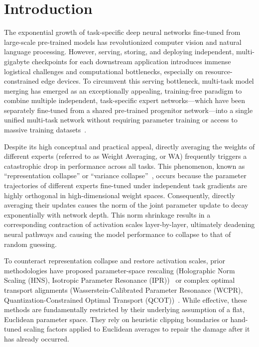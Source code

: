 \documentclass{article}
\theoremstyle{plain}
\theoremstyle{definition}
\theoremstyle{remark}
\begin{document}
\section{Introduction}
\label{sec:intro}
The exponential growth of task-specific deep neural networks fine-tuned from large-scale pre-trained models has revolutionized computer vision and natural language processing. However, serving, storing, and deploying independent, multi-gigabyte checkpoints for each downstream application introduces immense logistical challenges and computational bottlenecks, especially on resource-constrained edge devices. To circumvent this serving bottleneck, multi-task model merging has emerged as an exceptionally appealing, training-free paradigm to combine multiple independent, task-specific expert networks---which have been separately fine-tuned from a shared pre-trained progenitor network---into a single unified multi-task network without requiring parameter training or access to massive training datasets~\cite{wortsman2022model, ilharco2022editing}.

Despite its high conceptual and practical appeal, directly averaging the weights of different experts (referred to as Weight Averaging, or WA) frequently triggers a catastrophic drop in performance across all tasks. This phenomenon, known as ``representation collapse'' or ``variance collapse''~\cite{jordan2023repair, anonymous2026deconstruction}, occurs because the parameter trajectories of different experts fine-tuned under independent task gradients are highly orthogonal in high-dimensional weight spaces. Consequently, directly averaging their updates causes the norm of the joint parameter update to decay exponentially with network depth. This norm shrinkage results in a corresponding contraction of activation scales layer-by-layer, ultimately deadening neural pathways and causing the model performance to collapse to that of random guessing.

To counteract representation collapse and restore activation scales, prior methodologies have proposed parameter-space rescaling (Holographic Norm Scaling (HNS), Isotropic Parameter Resonance (IPR))~\cite{anonymous2026deconstruction} or complex optimal transport alignments (Wasserstein-Calibrated Parameter Resonance (WCPR), Quantization-Constrained Optimal Transport (QCOT))~\cite{anonymous2026qcot}. While effective, these methods are fundamentally restricted by their underlying assumption of a flat, Euclidean parameter space. They rely on heuristic clipping boundaries or hand-tuned scaling factors applied to Euclidean averages to repair the damage after it has already occurred.
\end{document}
